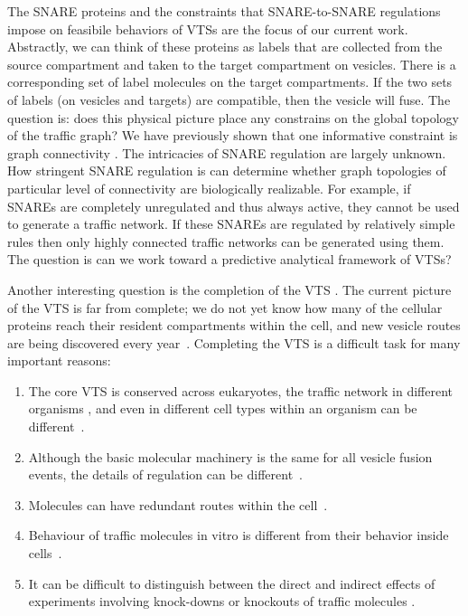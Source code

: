 The SNARE proteins and the constraints that SNARE-to-SNARE regulations
impose on feasibile behaviors of VTSs are the focus of
our current work.
%
Abstractly, we can think of these proteins as labels that are
collected from the source compartment and taken to the target
compartment on vesicles.
%
There is a corresponding set of label molecules on the target compartments.
%
If the two sets of labels (on vesicles and targets) are compatible,
then the vesicle will fuse.
%
The question is: does this physical picture place any constrains on
the global topology of the traffic graph? We have previously shown that one informative constraint is graph connectivity \cite{shukla2017discovering}.
%
The intricacies of SNARE regulation are largely unknown.
%
How stringent SNARE regulation is can determine whether graph
topologies of particular level of connectivity are biologically
realizable.
%
For example, if SNAREs are completely unregulated and thus always
active, they cannot be used to generate a traffic network.
%
If these SNAREs are regulated by relatively simple rules then only
highly connected traffic networks can be generated using them.
%
The question is can we work toward a predictive analytical framework
of VTSs?

Another interesting question is the completion of the VTS \cite{synthesisGupta}. 
%
The current picture of the VTS is far from complete; we do not yet know how many of the cellular proteins reach their resident compartments within the cell, and new vesicle routes are being discovered every year~\cite{nickel2018unconventional,weill2018toolbox}. 
%
Completing the VTS is a difficult task for many important reasons: 
\begin{enumerate}
	\item The core VTS is conserved across eukaryotes, the traffic network in different organisms \cite{richardson2015evolutionary, barlow2017seeing}, and even in different cell types within an organism can be different~\cite{stoops2014trafficking,zhou2015arp2}.
	\item Although the basic molecular machinery is the same for all vesicle fusion events, the details of regulation can be different~\cite{davletov2007regulation,di2010calcium}.
	\item Molecules can have redundant routes within the cell~\cite{shimizu2014compensatory,nakatsukasa2014nutrient}.
	\item Behaviour of traffic molecules in vitro is different from their behavior inside cells~\cite{furukawa2014multiple}. 
	\item It can be difficult to distinguish between the direct and indirect effects of experiments involving knock-downs or knockouts of traffic molecules \cite{hirst2004epsinr,mishev2013small}.
\end{enumerate}

